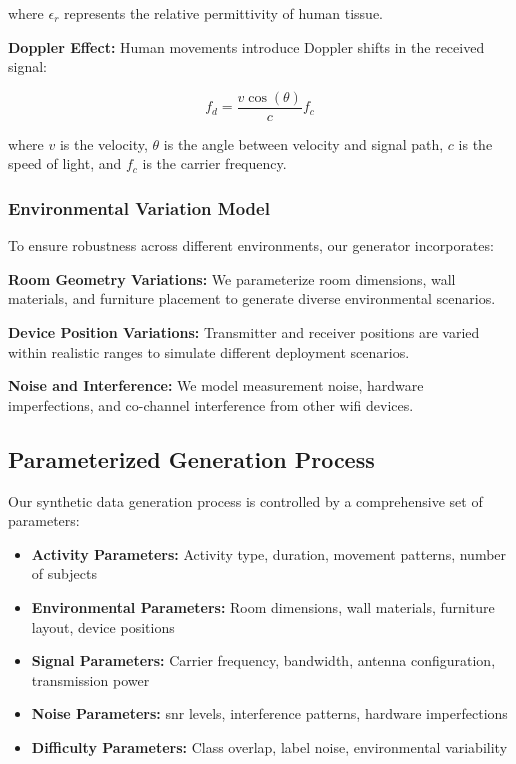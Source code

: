 \documentclass[journal]{IEEEtran}
\begin{document}
where $\epsilon_r$ represents the relative permittivity of human tissue.

\textbf{Doppler Effect:} Human movements introduce Doppler shifts in the received signal:

\begin{equation}
f_d = \frac{v \cos(\theta)}{c} f_c
\end{equation}

where $v$ is the velocity, $\theta$ is the angle between velocity and signal path, $c$ is the speed of light, and $f_c$ is the carrier frequency.

\subsubsection{Environmental Variation Model}

To ensure robustness across different environments, our generator incorporates:

\textbf{Room Geometry Variations:} We parameterize room dimensions, wall materials, and furniture placement to generate diverse environmental scenarios.

\textbf{Device Position Variations:} Transmitter and receiver positions are varied within realistic ranges to simulate different deployment scenarios.

\textbf{Noise and Interference:} We model measurement noise, hardware imperfections, and co-channel interference from other \gls{wifi} devices.

\subsection{Parameterized Generation Process}

Our synthetic data generation process is controlled by a comprehensive set of parameters:

\begin{itemize}
\item \textbf{Activity Parameters:} Activity type, duration, movement patterns, number of subjects
\item \textbf{Environmental Parameters:} Room dimensions, wall materials, furniture layout, device positions
\item \textbf{Signal Parameters:} Carrier frequency, bandwidth, antenna configuration, transmission power
\item \textbf{Noise Parameters:} \gls{snr} levels, interference patterns, hardware imperfections
\item \textbf{Difficulty Parameters:} Class overlap, label noise, environmental variability
\end{itemize}
\end{document}
